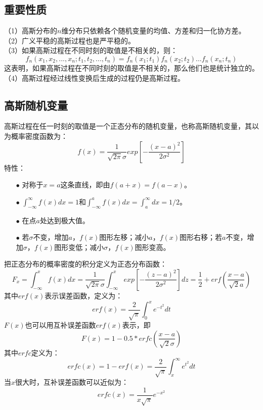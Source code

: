 \documentclass[12pt,a4paper,oneside]{ctexart}
\begin{document}
\subsection{重要性质}

\noindent（1）高斯分布的$n$维分布只依赖各个随机变量的均值、方差和归一化协方差。\\
（2）广义平稳的高斯过程也是严平稳的。\\
（3）如果高斯过程在不同时刻的取值是不相关的，则：
$$
   f_{n}(x_{1},x_{2},...,x_{n};t_{1},t_{2},...,t_{n}) = f_{n}(x_{1};t_{1})f_{n}(x_{2};t_{2})...f_{n}(x_{n};t_{n})
$$
这表明，如果高斯过程在不同时刻的取值是不相关的，那么他们也是统计独立的。\\
（4）高斯过程经过线性变换后生成的过程仍是高斯过程。
\subsection{高斯随机变量}
高斯过程在任一时刻的取值是一个正态分布的随机变量，也称高斯随机变量，其以为概率密度函数为：
$$
   f(x) = \frac{1}{\sqrt{2\pi}\sigma}exp\left[-\frac{(x-a)^{2}}{2\sigma^{2}}\right]
$$
特性：
\begin{itemize}
    \item[$\bullet$] 对称于$x=a$这条直线，即由$f(a+x) = f(a-x)$。
    \item[$\bullet$] $\int_{-\infty}^{\infty}f(x)dx = 1$和$\int_{-\infty}^{a}f(x)dx = \int_{a}^{\infty}dx = 1/2$。
    \item[$\bullet$] 在点$a$处达到极大值。
    \item[$\bullet$] 若$\sigma$不变，增加$a$，$f(x)$图形左移；减小$a$，$f(x)$图形右移；若$a$不变，增加$\sigma$，$f(x)$图形变低；减小$\sigma$，$f(x)$图形变高。
\end{itemize}
把正态分布的概率密度的积分定义为正态分布函数：
$$
    F_{x} = \int_{-\infty}^{x}f(x)dx = \frac{1}{\sqrt{2\pi}\sigma}\int_{-\infty}^{x}exp\left[-\frac{(z-a)^{2}}{2\sigma^{2}}\right]dz = \frac{1}{2} + erf(\frac{x-a}{\sqrt{2}a})
$$
其中$erf(x)$表示误差函数，定义为：
$$
    erf(x) = \frac{2}{\sqrt{\pi}}\int_{0}^{x}e^{-t^{2}}dt
$$
$F(x)$也可以用互补误差函数$erf(x)$表示，即
$$
    F(x) = 1-0.5*erfc(\frac{x-a}{\sqrt{2}\sigma})
$$
其中$erfc$定义为：
$$
    erfc(x) = 1 - erf(x) = \frac{2}{\sqrt{\pi}}\int_{x}^{\infty}e^{t^{2}}dt
$$
当$x$很大时，互补误差函数可以近似为：
$$
    erfc(x) = \frac{1}{x\sqrt{\pi}}e^{-x^{2}}
$$
\end{document}
